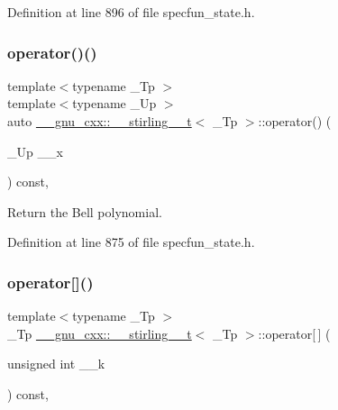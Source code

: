 Definition at line 896 of file specfun\+\_\+state.\+h.

\mbox{\label{struct____gnu__cxx_1_1____stirling__2__t_adae1c28a6bb1a10b483280ab755dea2b}} 
\subsubsection{\texorpdfstring{operator()()}{operator()()}}
{\footnotesize\ttfamily template$<$typename \+\_\+\+Tp $>$ \\
template$<$typename \+\_\+\+Up $>$ \\
auto \hyperlink{struct____gnu__cxx_1_1____stirling__2__t}{\+\_\+\+\_\+gnu\+\_\+cxx\+::\+\_\+\+\_\+stirling\+\_\+\_\+t}$<$ \+\_\+\+Tp $>$\+::operator() (\begin{DoxyParamCaption}\item[{\+\_\+\+Up}]{\+\_\+\+\_\+x }\end{DoxyParamCaption}) const\hspace{0.3cm}{\ttfamily [inline]}, {\ttfamily [noexcept]}}



Return the Bell polynomial. 



Definition at line 875 of file specfun\+\_\+state.\+h.

\mbox{\label{struct____gnu__cxx_1_1____stirling__2__t_afec14221335ce01ffbf73645a083fb36}} 
\subsubsection{\texorpdfstring{operator[]()}{operator[]()}}
{\footnotesize\ttfamily template$<$typename \+\_\+\+Tp $>$ \\
\+\_\+\+Tp \hyperlink{struct____gnu__cxx_1_1____stirling__2__t}{\+\_\+\+\_\+gnu\+\_\+cxx\+::\+\_\+\+\_\+stirling\+\_\+\_\+t}$<$ \+\_\+\+Tp $>$\+::operator\mbox{[}$\,$\mbox{]} (\begin{DoxyParamCaption}\item[{unsigned int}]{\+\_\+\+\_\+k }\end{DoxyParamCaption}) const\hspace{0.3cm}{\ttfamily [inline]}, {\ttfamily [noexcept]}}



